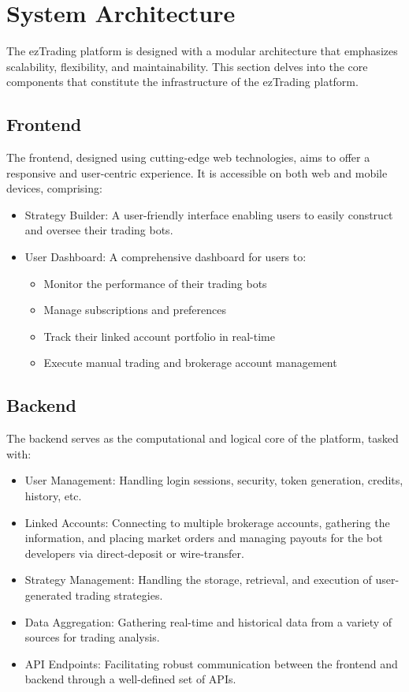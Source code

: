 

\section{System Architecture}
\label{sec:sys-arch}

The ezTrading platform is designed with a modular architecture that emphasizes scalability, flexibility, and maintainability. This section delves into the core components that constitute the infrastructure of the ezTrading platform.

\subsection{Frontend}
The frontend, designed using cutting-edge web technologies, aims to offer a responsive and user-centric experience. It is accessible on both web and mobile devices, comprising:

\begin{itemize}
  \item Strategy Builder: A user-friendly interface enabling users to easily construct and oversee their trading bots.
  \item User Dashboard: A comprehensive dashboard for users to:
    \begin{itemize}
      \item Monitor the performance of their trading bots
      \item Manage subscriptions and preferences
      \item Track their linked account portfolio in real-time
      \item Execute manual trading and brokerage account management
    \end{itemize}
\end{itemize}

\subsection{Backend}
The backend serves as the computational and logical core of the platform, tasked with:

\begin{itemize}
  \item User Management: Handling login sessions, security, token generation, credits, history, etc.
  \item Linked Accounts: Connecting to multiple brokerage accounts, gathering the information, and placing market orders and managing payouts for the bot developers via direct-deposit or wire-transfer.
  \item Strategy Management: Handling the storage, retrieval, and execution of user-generated trading strategies.
  \item Data Aggregation: Gathering real-time and historical data from a variety of sources for trading analysis.
  \item API Endpoints: Facilitating robust communication between the frontend and backend through a well-defined set of APIs.
\end{itemize}

